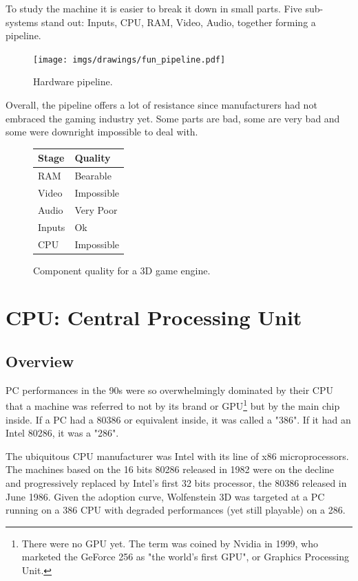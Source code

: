 \documentclass[book.tex]{subfiles}
\begin{document}
To study the machine it is easier to break it down in small parts. Five sub-systems stand out: Inputs, CPU, RAM, Video, Audio, together forming a pipeline.\\
\begin{figure}[H]
\centering
\texttt{[image: imgs/drawings/fun\_pipeline.pdf]}
\caption{Hardware pipeline.}
\label{fig:digraph}
\end{figure}

Overall, the pipeline offers a lot of resistance since manufacturers had not embraced the gaming industry yet. Some parts are bad, some are very bad and some were downright impossible to deal with.\\
\par

\begin{figure}[H]
\centering
\begin{tabularx}{\textwidth}{ X X  }
  \toprule
  \textbf{Stage} & \textbf{Quality} \\ \bottomrule
  RAM & Bearable \\ 
  Video & Impossible \\ 
  Audio & Very Poor \\ 
  Inputs & Ok \\ 
  CPU & Impossible \\ \bottomrule
\end{tabularx}
\caption{Component quality for a 3D game engine.}
\end{figure}



\section{CPU: Central Processing Unit}
  \subsection{Overview}
  PC performances in the 90s were so overwhelmingly dominated by their CPU that a machine was referred to not by its brand or GPU\footnote{There were no GPU yet. The term was coined by Nvidia in 1999, who marketed the GeForce 256 as "the world's first GPU", or Graphics Processing Unit.} but by the main chip inside. If a PC had a 80386 or equivalent inside, it was called a "386". If it had an Intel 80286, it was a "286".\\
\par
  The ubiquitous CPU manufacturer was Intel with its line of x86 microprocessors. The machines based on the 16 bits 80286 released in 1982 were on the decline and progressively replaced by Intel's first 32 bits processor, the 80386 released in June 1986. Given the adoption curve, Wolfenstein 3D was targeted at a PC running on a 386 CPU with degraded performances (yet still playable) on a 286.\\
\par
\end{document}
